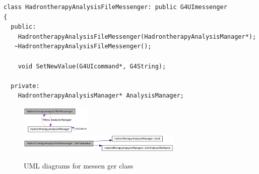 \scriptsize
\begin{verbatim}
class HadrontherapyAnalysisFileMessenger: public G4UImessenger
{
  public:
    HadrontherapyAnalysisFileMessenger(HadrontherapyAnalysisManager*);
   ~HadrontherapyAnalysisFileMessenger();
    
    void SetNewValue(G4UIcommand*, G4String);
    
  private:
    HadrontherapyAnalysisManager* AnalysisManager;
\end{verbatim}
\normalsize
\begin{figure}[h] 
\begin{center}
\includegraphics[width=0.3\textwidth]{images/setFileNameMessenger_1.png}  
\includegraphics[width=0.7\textwidth]{images/setFileNameMessenger_2.png}  
\caption{\label{fig:messengerUML} UML diagrams for messen ger class}
 
 \end{center}
 \end{figure}





